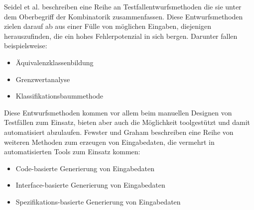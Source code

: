 Seidel et al. \cite[vgl. S. 27]{seidl_basiswissen_2012} beschreiben eine Reihe an Testfallentwurfsmethoden die sie unter dem Oberbegriff der Kombinatorik zusammenfassen. Diese Entwurfsmethoden zielen darauf ab aus einer Fülle von möglichen Eingaben, diejenigen herauszufinden, die ein hohes Fehlerpotenzial in sich bergen. Darunter fallen beispielsweise:
\begin{itemize}
\item Äquivalenzklassenbildung
\item Grenzwertanalyse
\item Klassifikationsbaummethode
\end{itemize}
Diese Entwurfsmethoden kommen vor allem beim manuellen Designen von Testfällen zum Einsatz, bieten aber auch die Möglichkeit toolgestützt und damit automatisiert abzulaufen.
Fewster und Graham \cite[vgl. S. 19 ff.]{fewster_software_1999} beschreiben eine Reihe von weiteren Methoden zum erzeugen von Eingabedaten, die vermehrt in automatisierten Tools zum Einsatz kommen:
\begin{itemize}
\item Code-basierte Generierung von Eingabedaten
\item Interface-basierte Generierung von Eingabedaten
\item Spezifikations-basierte Generierung von Eingabedaten
\end{itemize}

